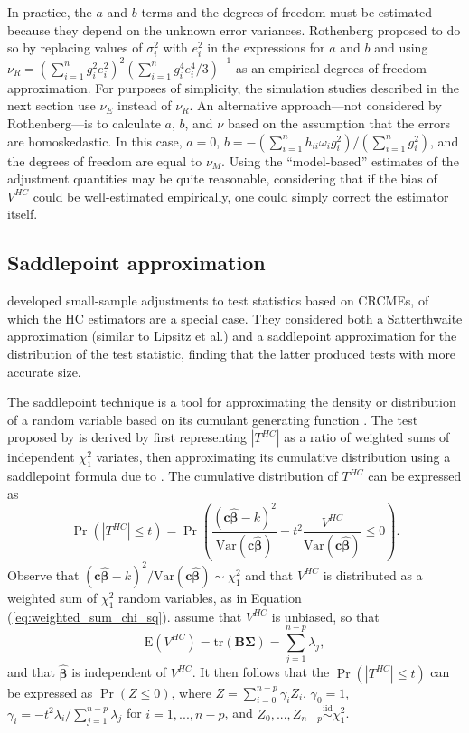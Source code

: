 \documentclass[12pt]{article}\usepackage[]{graphicx}\usepackage[]{color}
\newcommand{\E}{\text{E}}
\newcommand{\Var}{\text{Var}}
\newcommand{\tr}{\text{tr}}
\newcommand{\iid}{\stackrel{\text{iid}}{\sim}}
\newcommand{\bm}{\mathbf}
\newcommand{\bs}{\boldsymbol}
\begin{document}
In practice, the $a$ and $b$ terms and the degrees of freedom must be estimated because they depend on the unknown error variances.
Rothenberg proposed to do so by replacing values of $\sigma_i^2$ with $e_i^2$ in the expressions for $a$ and $b$ and using $\nu_R = \left(\sum_{i=1}^n g_i^2 e_i^2\right)^2 \left(\sum_{i=1}^n g_i^4 e_i^4 / 3 \right)^{-1}$ as an empirical degrees of freedom approximation. 
For purposes of simplicity, the simulation studies described in the next section use $\nu_E$ instead of $\nu_R$. 
An alternative approach---not considered by Rothenberg---is to calculate $a$, $b$, and $\nu$ based on the assumption that the errors are homoskedastic. In this case, $a = 0$, $b = - \left(\sum_{i=1}^n h_{ii} \omega_i g_i^2\right) / \left(\sum_{i=1}^n g_i^2\right)$, and the degrees of freedom are equal to $\nu_M$. 
Using the ``model-based'' estimates of the adjustment quantities may be quite reasonable, considering that if the bias of $V^{HC}$ could be well-estimated empirically, one could simply correct the estimator itself.

\subsection{Saddlepoint approximation}

\citet{McCaffrey2006improved} developed small-sample adjustments to test statistics based on CRCMEs, of which the HC estimators are a special case. 
They considered both a Satterthwaite approximation (similar to Lipsitz et al.) and a saddlepoint approximation for the distribution of the test statistic, finding that the latter produced tests with more accurate size. 

The saddlepoint technique is a tool for approximating the density or distribution of a random variable based on its cumulant generating function \citep{Goutis1999explaining, Huzurbazar1999practical}.
The test proposed by \citet{McCaffrey2006improved} is derived by first representing $\left|T^{HC}\right|$ as a ratio of weighted sums of independent $\chi^2_1$ variates, then approximating its cumulative distribution using a saddlepoint formula due to \citet{Lugannani1980saddlepoint}. 
The cumulative distribution of $T^{HC}$ can be expressed as \[
\Pr\left(\left|T^{HC}\right| \leq t\right) = \Pr\left(\frac{\left(\bm{c}\bs{\hat\beta} - k\right)^2}{\Var\left(\bm{c}\bs{\hat\beta}\right)} - t^2 \frac{V^{HC}}{\Var\left(\bm{c}\bs{\hat\beta}\right)} \leq 0\right). \]
Observe that $\left(\bm{c}\bs{\hat\beta} - k\right)^2 / \Var\left(\bm{c}\bs{\hat\beta}\right) \sim \chi^2_1$ and that $V^{HC}$ is distributed as a weighted sum of $\chi^2_1$ random variables, as in Equation (\ref{eq:weighted_sum_chi_sq}). 
\citet{McCaffrey2006improved} assume that $V^{HC}$ is unbiased, so that \[
\E\left(V^{HC}\right) = \tr\left(\bm{B}\bs\Sigma\right) = \sum_{j=1}^{n - p} \lambda_j, \]
and that $\bs{\hat\beta}$ is independent of $V^{HC}$. 
It then follows that the $\Pr\left(\left|T^{HC}\right| \leq t\right)$ can be expressed as $\Pr(Z \leq 0)$, where $Z = \sum_{i=0}^{n-p} \gamma_i Z_i$,
$\gamma_0 = 1$, $\gamma_i = -t^2 \lambda_i / \sum_{j=1}^{n - p} \lambda_j$ for $i = 1,...,n - p$, and $Z_0,...,Z_{n-p} \iid \chi^2_1$.
\end{document}
